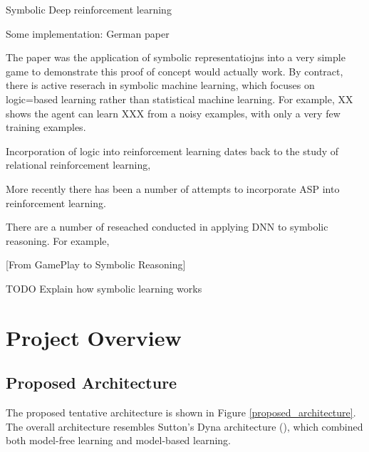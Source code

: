 \documentclass[12pt,twoside]{report}
\begin{document}
Symbolic Deep reinforcement learning

Some implementation: German paper

The paper was the application of symbolic representatiojns into a very simple game to demonstrate this proof of concept would actually work.
By contract, there is active reserach in symbolic machine learning, which focuses on logic=based learning rather than statistical machine learning.
For example, XX shows the agent can learn XXX from a noisy examples, with only a very few training examples.


Incorporation of logic into reinforcement learning dates back to the study of relational reinforcement learning,


More recently there has been a number of attempts to incorporate ASP into reinforcement learning.

There are a number of reseached conducted in applying DNN to symbolic reasoning.
For example,

[From GamePlay to Symbolic Reasoning]


TODO Explain how symbolic learning works


\chapter{Project Overview}
\label{project_overview}

\section{Proposed Architecture}
\label{proposed_architecture_section}

The proposed tentative architecture is shown in Figure \ref{proposed_architecture}. The overall architecture resembles Sutton's Dyna architecture (\cite{Sutton1990}), which combined both model-free learning and model-based learning.
\end{document}
